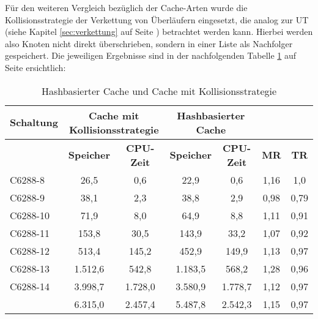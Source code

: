 Für den weiteren Vergleich bezüglich der Cache-Arten wurde die Kollisionsstrategie der Verkettung von Überläufern eingesetzt, die analog zur UT (siehe Kapitel \ref{sec:verkettung} auf Seite \pageref{sec:verkettung}) betrachtet werden kann. Hierbei werden also Knoten nicht direkt überschrieben, sondern in einer Liste als Nachfolger gespeichert. Die jeweiligen Ergebnisse sind in der nachfolgenden Tabelle \ref{tab:vglcKc} auf Seite \pageref{tab:vglcKc} ersichtlich:
\newpage
\begin{table}[bth]
	\footnotesize
	\centering
	\caption{Hashbasierter Cache und Cache mit Kollisionsstrategie}
	\label{tab:vglcKc}
	\begin{tabular}{ | l | c | c | c | c | c | c |}
		\hline
		\multicolumn{1}{|c|}{\textbf{Schaltung}} & \multicolumn{2}{c|}{\textbf{Cache mit Kollisionsstrategie}} & \multicolumn{2}{c|}{\textbf{Hashbasierter Cache}} & \multicolumn{2}{c|}{~} \\ \hline
		~ & \multicolumn{1}{c|}{\textbf{Speicher}} & \multicolumn{1}{c|}{\textbf{CPU-Zeit}} & \multicolumn{1}{c|}{\textbf{Speicher}} & \multicolumn{1}{c|}{\textbf{CPU-Zeit}} & \multicolumn{1}{c|}{\textbf{MR}} & \multicolumn{1}{c|}{\textbf{TR}}\\ \hline
		C6288-8 & 26,5 & 0,6 & 22,9 & 0,6 & 1,16 & 1,0  \\ \hline
		C6288-9 & 38,1 & 2,3 & 38,8 & 2,9 & 0,98 & 0,79  \\ \hline
		C6288-10 & 71,9 & 8,0 & 64,9 & 8,8 & 1,11 & 0,91  \\ \hline
		C6288-11 & 153,8 & 30,5 & 143,9 & 33,2 & 1,07 & 0,92  \\ \hline
		C6288-12 & 513,4 & 145,2 & 452,9 & 149,9 & 1,13 & 0,97  \\ \hline
		C6288-13 & 1.512,6 & 542,8 & 1.183,5 & 568,2 & 1,28 & 0,96 \\ \hline
		C6288-14 & 3.998,7 & 1.728,0 & 3.580,9 & 1.778,7 & 1,12 & 0,97 \\ \hlineB{3}
		\multicolumn{1}{|c|}{\textbf{Gesamt}} & 6.315,0 & 2.457,4 & 5.487,8 & 2.542,3 & 1,15 & 0,97 \\ \hline
	\end{tabular}
\end{table}
\noindent
